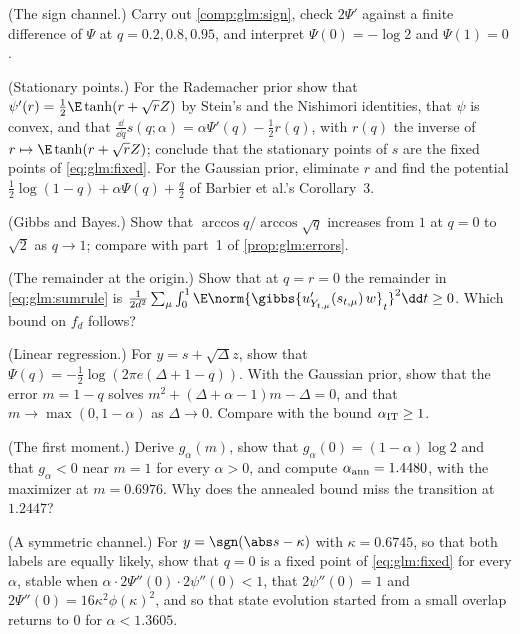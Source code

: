 \begin{refsection}
\begin{exercises}
\item \consolidation (The sign channel.) Carry out \cref{comp:glm:sign}, check $2\Psi'$ against a finite difference of $\Psi$ at $q=0.2,0.8,0.95$, and interpret $\Psi(0)=-\log2$ and $\Psi(1)=0$.\label{ex:glm:sign}

\item \consolidation (Stationary points.) For the Rademacher prior show that $\psi'(r)=\frac12\E\tanh(r+\sqrt rZ)$ by Stein's and the Nishimori identities, that $\psi$ is convex, and that $\frac{\dd}{\dd q}s(q;\alpha)=\alpha\Psi'(q)-\frac12r(q)$, with $r(q)$ the inverse of $r\mapsto\E\tanh(r+\sqrt rZ)$; conclude that the stationary points of $s$ are the fixed points of \eqref{eq:glm:fixed}. For the Gaussian prior, eliminate $r$ and find the potential $\frac12\log(1-q)+\alpha\Psi(q)+\frac q2$ of Barbier et al.'s Corollary~3.\label{ex:glm:stationary}

\item \consolidation (Gibbs and Bayes.) Show that $\arccos q/\arccos\sqrt q$ increases from $1$ at $q=0$ to $\sqrt2$ as $q\to1$; compare with part~1 of \cref{prop:glm:errors}.\label{ex:glm:gibbs}

\item \consolidation (The remainder at the origin.) Show that at $q=r=0$ the remainder in \eqref{eq:glm:sumrule} is $\frac1{2d^2}\sum_\mu\int_0^1\E\norm{\gibbs{u'_{Y_{t,\mu}}(s_{t,\mu})\,w}_t}^2\dd t\ge0$.  Which bound on $f_d$ follows?\label{ex:glm:remainder}

\item \byhand (Linear regression.) For $y=s+\sqrt\Delta z$, show that $\Psi(q)=-\frac12\log(2\pi e(\Delta+1-q))$. With the Gaussian prior, show that the error $m=1-q$ solves $m^2+(\Delta+\alpha-1)m-\Delta=0$, and that $m\to\max(0,1-\alpha)$ as $\Delta\to0$. Compare with the bound $\alpha_{\mathrm{IT}}\ge1$.\label{ex:glm:linear}

\item \byhand (The first moment.) Derive $g_\alpha(m)$, show that $g_\alpha(0)=(1-\alpha)\log2$ and that $g_\alpha<0$ near $m=1$ for every $\alpha>0$, and compute $\alpha_{\mathrm{ann}}=1.4480$, with the maximizer at $m=0.6976$. Why does the annealed bound miss the transition at $1.2447$?\label{ex:glm:annealed}

\item \byhand\hard (A symmetric channel.) For $y=\sgn(\abs s-\kappa)$ with $\kappa=0.6745$, so that both labels are equally likely, show that $q=0$ is a fixed point of \eqref{eq:glm:fixed} for every $\alpha$, stable when $\alpha\cdot2\Psi''(0)\cdot2\psi''(0)<1$, that $2\psi''(0)=1$ and $2\Psi''(0)=16\kappa^2\phi(\kappa)^2$, and so that state evolution started from a small overlap returns to $0$ for $\alpha<1.3605$. \label{ex:glm:door}


\end{exercises}
\end{refsection}
